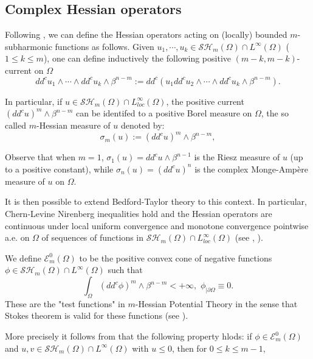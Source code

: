 \documentclass[12pt]{amsart}
\theoremstyle{definition}
\numberwithin{theorem}{section}
\numberwithin{equation}{section}
\begin{document}
\subsection{Complex Hessian operators}

Following \cite{Bl05}, we can define the Hessian operators acting on (locally) bounded $m$-subharmonic functions as follows. 
 Given $u_1, \cdots, u_k \in \mathcal{SH}_m (\Omega) \cap L^{\infty} (\Omega)$ ($1 \leq k \leq m$), one can define inductively the following  positive $(m-k,m-k)$-current on $\Omega$
$$
dd^c u_1 \wedge \cdots \wedge dd^c u_k \wedge \beta^{n - m} := dd^c (u_1 dd^c u_2 \wedge \cdots \wedge dd^c u_k \wedge \beta^{n - m}).
$$

In particular, if $u  \in \mathcal{SH}_m (\Omega) \cap L^{\infty}_{loc} (\Omega)$, the positive current $(dd^c u)^m \wedge \beta^{n-m}$ can be identifed to a  positive Borel measure on $\Omega$, the so called $m$-Hessian measure of $u$ denoted by:
$$
\sigma_m (u) := (dd^c u)^m \wedge \beta^{n-m},
$$

Observe that when $m= 1$,  $\sigma_1 (u) = dd^c u \wedge \beta^{n-1} $ is the Riesz measure of $u$ (up to a positive constant), while  $\sigma_n (u) = (dd^c u)^n$ is the complex   Monge-Amp\`ere measure of $u$ on $\Omega$. 

It is then possible to extend Bedford-Taylor theory to this context. 
In particular, Chern-Levine Nirenberg inequalities hold and the Hessian operators are continuous under local uniform convergence and  monotone convergence 
pointwise a.e. on $\Omega$ of sequences of functions in  $\mathcal{SH}_m (\Omega) \cap L^{\infty}_{loc} (\Omega)$ (see \cite{Bl05}, \cite{Lu12}).

We define  $\mathcal{E}_m^0 (\Omega) $ to be the positive convex cone of  negative  functions  $\phi \in \mathcal{SH}_m (\Omega) \cap L^{\infty} (\Omega)$ such that
$$
\int_{\Omega} (dd^c \phi)^m \wedge \beta^{n - m} < + \infty, \, \, \phi_{|\partial \Omega} \equiv 0.
$$
These are the "test functions" in  $m$-Hessian Potential Theory in the sense that Stokes theorem is valid for these functions (see \cite{Lu12}).

More precisely it follows from \cite{Lu12,Lu15} that the following property hlods:  if $\phi \in  \mathcal{E}_m^0 (\Omega) $ and $u , v \in \mathcal{SH}_m (\Omega) \cap L^{\infty} (\Omega)$ with $u \leq 0$, then for $0 \leq k \leq m - 1$, 
\end{document}

